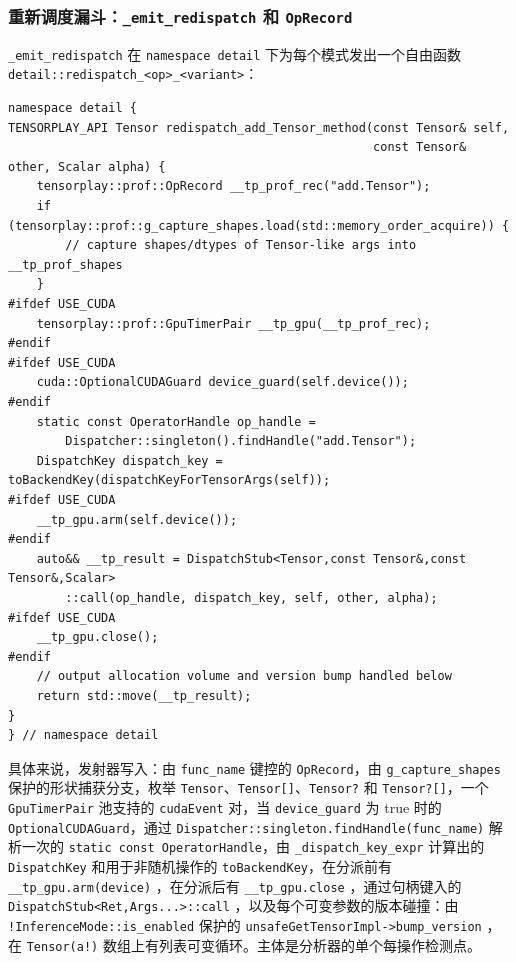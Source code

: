 \subsubsection{重新调度漏斗：\texttt{\_emit\_redispatch} 和 \texttt{OpRecord}}

\texttt{\_emit\_redispatch} 在 \texttt{namespace detail} 下为每个模式发出一个自由函数 \texttt{detail::redispatch\_<op>\_<variant>}：

\begin{lstlisting}[caption={skeleton of \texttt{\_emit\_redispatch} (simplified).}, label=lst:emitredispatch, style=cppstyle]
namespace detail {
TENSORPLAY_API Tensor redispatch_add_Tensor_method(const Tensor& self,
                                                   const Tensor& other, Scalar alpha) {
    tensorplay::prof::OpRecord __tp_prof_rec("add.Tensor");
    if (tensorplay::prof::g_capture_shapes.load(std::memory_order_acquire)) {
        // capture shapes/dtypes of Tensor-like args into __tp_prof_shapes
    }
#ifdef USE_CUDA
    tensorplay::prof::GpuTimerPair __tp_gpu(__tp_prof_rec);
#endif
#ifdef USE_CUDA
    cuda::OptionalCUDAGuard device_guard(self.device());
#endif
    static const OperatorHandle op_handle =
        Dispatcher::singleton().findHandle("add.Tensor");
    DispatchKey dispatch_key = toBackendKey(dispatchKeyForTensorArgs(self));
#ifdef USE_CUDA
    __tp_gpu.arm(self.device());
#endif
    auto&& __tp_result = DispatchStub<Tensor,const Tensor&,const Tensor&,Scalar>
        ::call(op_handle, dispatch_key, self, other, alpha);
#ifdef USE_CUDA
    __tp_gpu.close();
#endif
    // output allocation volume and version bump handled below
    return std::move(__tp_result);
}
} // namespace detail
\end{lstlisting}

具体来说，发射器写入：由 \texttt{func\_name} 键控的 \texttt{OpRecord}，由 \texttt{g\_capture\_shapes} 保护的形状捕获分支，枚举 \texttt{Tensor}、\texttt{Tensor[]}、\texttt{Tensor?} 和 \texttt{Tensor?[]}，一个 \texttt{GpuTimerPair} 池支持的 \texttt{cudaEvent} 对，当 \texttt{device\_guard} 为 true 时的 \texttt{OptionalCUDAGuard}，通过 \texttt{Dispatcher::singleton.findHandle(func\_name)} 解析一次的 \texttt{static const OperatorHandle}，由 \texttt{\_dispatch\_key\_expr} 计算出的 \texttt{DispatchKey} 和用于非随机操作的 \texttt{toBackendKey}，在分派前有 \texttt{\_\_tp\_gpu.arm(device)} ，在分派后有 \texttt{\_\_tp\_gpu.close} ，通过句柄键入的 \texttt{DispatchStub<Ret,Args...>::call} ，以及每个可变参数的版本碰撞：由 \texttt{!InferenceMode::is\_enabled} 保护的 \texttt{unsafeGetTensorImpl->bump\_version} ，在 \texttt{Tensor(a!)} 数组上有列表可变循环。主体是分析器的单个每操作检测点。

